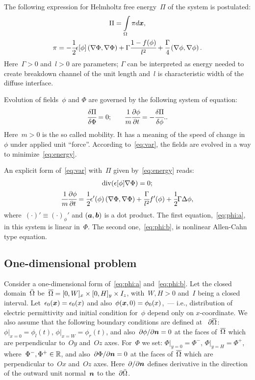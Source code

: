 The following expression for Helmholtz free energy~$\Pi$ of the system
is postulated:
\begin{gather}
  \Pi = \int \limits_\Omega \pi d {\boldsymbol{x}} {\text{,}}
  \label{eq:energy} \\
  \pi = -\cfrac{1}{2} \epsilon[\phi] \left( \nabla \Phi, \nabla \Phi \right) + \Gamma \cfrac{1 - f(\phi)}{l^2} + \cfrac{\Gamma}{4} \left( \nabla \phi, \nabla \phi \right) {\text{.}}
  \label{eq:energy_density}
\end{gather}
Here~$\Gamma > 0$ and~$l > 0$ are parameters;
$\Gamma$ can be interpreted as energy needed to create breakdown
channel of the unit length and~$l$ is characteristic width of the
diffuse interface.

Evolution of fields~$\phi$ and $\Phi$ are governed by the following
system of equation:
%
\begin{equation}\label{eq:var}
\cfrac{\delta \Pi}{\delta \Phi} = 0 {\text{;}} \qquad \cfrac{1}{m}
\cfrac{\partial \phi}{\partial t} = -\cfrac{\delta \Pi}{\delta \phi} {\text{.}}.
\end{equation}
Here~$m > 0$ is the so called mobility. It has a meaning of the speed
of change in~$\phi$ under applied unit ``force''.
According to~\eqref{eq:var}, the fields are evolved in a way to minimize~\eqref{eq:energy}.

An explicit form of~\eqref{eq:var} with~$\Pi$ given
by~\eqref{eq:energy} reads:
\begin{gather}
  \Div(\epsilon[\phi] \nabla \Phi) = 0 \tsemicolon
  \label{eq:phi:a} \\ %
  \cfrac{1}{m} \partt{\phi} = \half \epsilon'(\phi) \scalsq{\Phi} + \cfrac{\Gamma}{l^2} f'(\phi) + \half \Gamma \Delta \phi,
  \label{eq:phi:b}
\end{gather}
%
where~$(\cdot)' \equiv (\cdot)_\phi'$ and $(\boldsymbol{a},\boldsymbol{b})$ is a
dot product.
The first equation,~\eqref{eq:phi:a}, in this system is linear in~$\Phi$.
The second one,~\eqref{eq:phi:b}, is nonlinear Allen-Cahn type equation.

\subsection{One-dimensional problem}
Consider a one-dimensional form of~\eqref{eq:phi:a}
and~\eqref{eq:phi:b}.
Let the closed domain~$\Bar\Omega$ be~${\overline{\Omega}} = [0, W]_x \times [0, H]_y
\times I_z$,
with~$W,H > 0$ and~$I$ being a closed interval.
Let~$\epsilon_0({\boldsymbol{x}}) = \epsilon_0(x)$
and also~$\phi({\boldsymbol{x}}, 0) = \phi_0(x)$,~--- i.e., distribution of
electric permittivity and initial condition for~$\phi$ depend only on
$x$-coordinate.
We also assume that the following boundary conditions are defined
at~ $\partial{\overline{\Omega}}$: $\phi|_{x = 0} = \phi_l(t)$, $\phi|_{x = W} = \phi_r(t)$,
and also~$\partial \phi / \partial {\boldsymbol{n}}= 0$ at the faces of~${\overline{\Omega}}$ which are perpendicular to~$Oy$ and~$Oz$
axes. For~$\Phi$ we set: $\Phi|_{y = 0} = \Phi^-$, $\Phi|_{y = H} = \Phi^+$, where~$\Phi^-, \Phi^+ \in {\mathbb{R}}$,
and also~$\partial \Phi / \partial {\boldsymbol{n}} = 0$ at the faces of~${\overline{\Omega}}$ which are perpendicular to~$Ox$ and~$Oz$ axes.
Here~$\partial  / \partial {\boldsymbol{n}}$ defines derivative in the direction of the outward unit normal~$\boldsymbol{n}$ to the~$\partial\Bar\Omega$.

